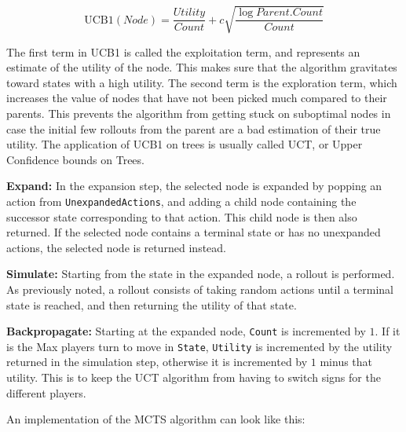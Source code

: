 \begin{equation}
    \text{UCB1}(Node) = \frac{Utility}{Count} + 
    c\sqrt{\frac{\log{Parent.Count}}{Count}}
\end{equation}

The first term in UCB1 is called the exploitation term, and represents
an estimate of the utility of the node. This makes sure that the algorithm
gravitates toward states with a high utility. The second term is the
exploration term, which increases the value of nodes that have not been
picked much compared to their parents. This prevents the algorithm from
getting stuck on suboptimal nodes in case the initial few rollouts from
the parent are a bad estimation of their true utility. The application
of UCB1 on trees is usually called UCT, or Upper Confidence bounds on Trees.

\textbf{Expand:} In the expansion step, the selected node is expanded by 
popping an action from \lstinline|UnexpandedActions|, and adding a child 
node containing the successor state corresponding to that action. This
child node is then also returned. If the selected node contains a terminal 
state or has no unexpanded actions, the selected node is returned instead.

\textbf{Simulate:} Starting from the state in the expanded node, a rollout
is performed. As previously noted, a rollout consists of taking random
actions until a terminal state is reached, and then returning the utility
of that state.

\textbf{Backpropagate:} Starting at the expanded node, \lstinline|Count| is 
incremented by $1$. If it is the Max players turn to move in 
\lstinline|State|, \lstinline|Utility| is incremented by the utility
returned in the simulation step, otherwise it is incremented by $1$ minus
that utility. This is to keep the UCT algorithm from having to switch
signs for the different players.



An implementation of the MCTS algorithm can look like this:

